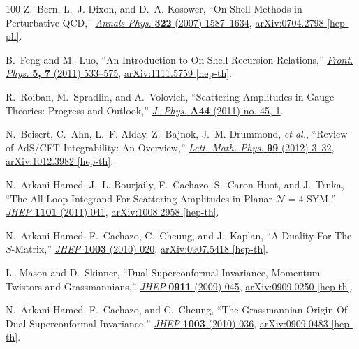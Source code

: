 \documentclass[12pt,hyperref,compress]{JHEP3}
\begin{document}
\begin{thebibliography}{100}
Z.~Bern, L.~J. Dixon, and D.~A. Kosower, ``{On-Shell Methods in Perturbative
  QCD},'' \href{http://dx.doi.org/10.1016/j.aop.2007.04.014}{{\em Annals Phys.}
  {\bf 322} (2007)  1587--1634},
\href{http://arxiv.org/abs/0704.2798}{{ arXiv:0704.2798 [hep-ph]}}.

B.~Feng and M.~Luo, ``{An Introduction to On-Shell Recursion Relations},''
  \href{http://dx.doi.org/10.1007/s11467-012-0270-z}{{\em Front. Phys.} {\bf 5,
  7} (2011)  533--575},
\href{http://arxiv.org/abs/1111.5759}{{ arXiv:1111.5759 [hep-th]}}.

R.~Roiban, M.~Spradlin, and A.~Volovich, ``{Scattering Amplitudes in Gauge
  Theories: Progress and Outlook},''
  \href{http://dx.doi.org/10.1088/1751-8113/44/45/450301}{{\em J. Phys.} {\bf
  A44} (2011) no. 45, 1}.

N.~Beisert, C.~Ahn, L.~F. Alday, Z.~Bajnok, J.~M. Drummond, {\em et al.},
  ``{Review of AdS/CFT Integrability: An Overview},''
  \href{http://dx.doi.org/10.1007/s11005-011-0529-2}{{\em Lett. Math. Phys.}
  {\bf 99} (2012)  3--32},
\href{http://arxiv.org/abs/1012.3982}{{ arXiv:1012.3982 [hep-th]}}.

N.~Arkani-Hamed, J.~L. Bourjaily, F.~Cachazo, S.~Caron-Huot, and J.~Trnka,
  ``{The All-Loop Integrand For Scattering Amplitudes in Planar
  $\mathcal{N}\!=\!4$ SYM},''
  \href{http://dx.doi.org/10.1007/JHEP01(2011)041}{{\em JHEP} {\bf 1101} (2011)
   041},
\href{http://arxiv.org/abs/1008.2958}{{ arXiv:1008.2958 [hep-th]}}.

N.~Arkani-Hamed, F.~Cachazo, C.~Cheung, and J.~Kaplan, ``{A Duality For The
  $S$-Matrix},'' \href{http://dx.doi.org/10.1007/JHEP03(2010)020}{{\em JHEP}
  {\bf 1003} (2010)  020},
\href{http://arxiv.org/abs/0907.5418}{{ arXiv:0907.5418 [hep-th]}}.

L.~Mason and D.~Skinner, ``{Dual Superconformal Invariance, Momentum Twistors
  and Grassmannians},''
  \href{http://dx.doi.org/10.1088/1126-6708/2009/11/045}{{\em JHEP} {\bf 0911}
  (2009)  045},
\href{http://arxiv.org/abs/0909.0250}{{ arXiv:0909.0250 [hep-th]}}.

N.~Arkani-Hamed, F.~Cachazo, and C.~Cheung, ``{The Grassmannian Origin Of Dual
  Superconformal Invariance},''
  \href{http://dx.doi.org/10.1007/JHEP03(2010)036}{{\em JHEP} {\bf 1003} (2010)
   036},
\href{http://arxiv.org/abs/0909.0483}{{ arXiv:0909.0483 [hep-th]}}.


\end{thebibliography}
\end{document}

